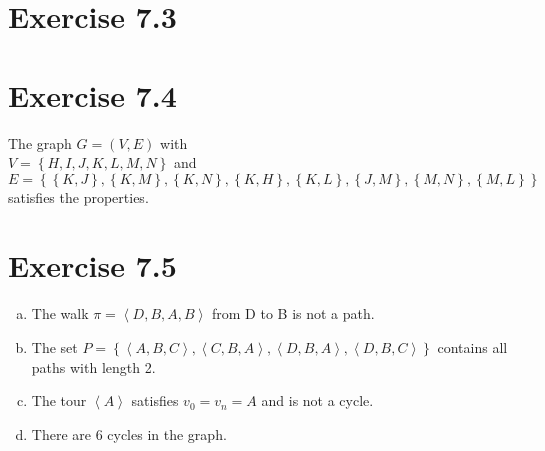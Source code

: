 \documentclass{article} %
\newcommand{\homeworkNumber}{7}
\begin{document}
\section*{Exercise \homeworkNumber.3}



\section*{Exercise \homeworkNumber.4}
The graph \( G = (V,E) \) with \\
\( V = \left\{ H, I, J, K, L, M, N  \right\}  \) and \\
\( E = \left\{ \left\{ K, J \right\}, \left\{ K,M \right\}, \left\{ K,N \right\}, \left\{ K,H \right\}, \left\{ K,L \right\}, \left\{ J,M \right\}, \left\{ M,N \right\}, \left\{ M,L \right\}   \right\} \) \\
satisfies the properties.



\section*{Exercise \homeworkNumber.5}

\begin{enumerate}[(a)]
	\item The walk \( \pi =  \left< D,B,A,B \right> \) from D to B is not a path.
	\item The set \( P = \left\{ \left< A, B, C \right>, \left< C, B, A \right>, \left< D,B,A \right>, \left< D,B,C \right> \right\}   \) contains all paths with length 2.
	\item The tour \( \left< A \right> \) satisfies \( v_{0} = v_{n} = A \) and is not a cycle.
	\item There are 6 cycles in the graph.
\end{enumerate}
\end{document}
